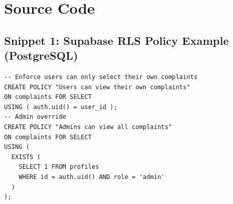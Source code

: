 \documentclass[12pt, a4paper, twoside]{report}
\begin{document}
\appendix
\chapter{Source Code}
\section*{Snippet 1: Supabase RLS Policy Example (PostgreSQL)}
\begin{footnotesize}
\begin{verbatim}
-- Enforce users can only select their own complaints
CREATE POLICY "Users can view their own complaints"
ON complaints FOR SELECT
USING ( auth.uid() = user_id );
-- Admin override
CREATE POLICY "Admins can view all complaints"
ON complaints FOR SELECT
USING ( 
  EXISTS (
    SELECT 1 FROM profiles 
    WHERE id = auth.uid() AND role = 'admin'
  )
);
\end{verbatim}
\end{footnotesize}
\vspace{1cm}
\end{document}
